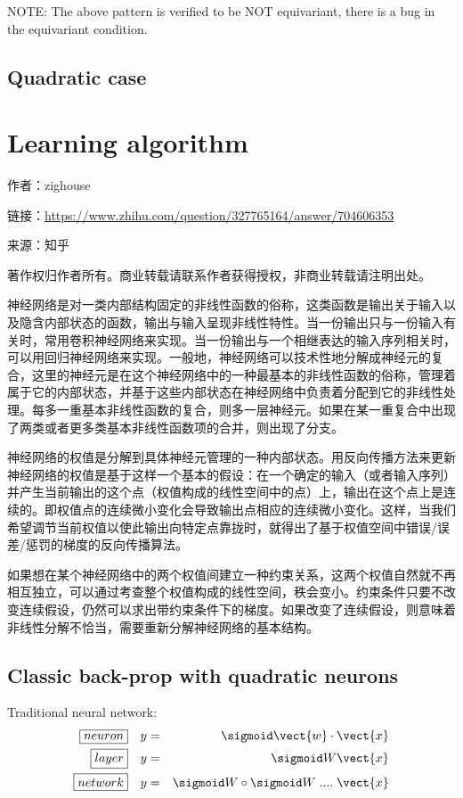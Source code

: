 NOTE:  The above pattern is verified to be NOT equivariant, there is a bug in the equivariant condition.

\subsection{Quadratic case}

\section{Learning algorithm}

作者：zighouse

链接：\url{https://www.zhihu.com/question/327765164/answer/704606353}

来源：知乎

著作权归作者所有。商业转载请联系作者获得授权，非商业转载请注明出处。

神经网络是对一类内部结构固定的非线性函数的俗称，这类函数是输出关于输入以及隐含内部状态的函数，输出与输入呈现非线性特性。当一份输出只与一份输入有关时，常用卷积神经网络来实现。当一份输出与一个相继表达的输入序列相关时，可以用回归神经网络来实现。一般地，神经网络可以技术性地分解成神经元的复合，这里的神经元是在这个神经网络中的一种最基本的非线性函数的俗称，管理着属于它的内部状态，并基于这些内部状态在神经网络中负责着分配到它的非线性处理。每多一重基本非线性函数的复合，则多一层神经元。如果在某一重复合中出现了两类或者更多类基本非线性函数项的合并，则出现了分支。

神经网络的权值是分解到具体神经元管理的一种内部状态。用反向传播方法来更新神经网络的权值是基于这样一个基本的假设：在一个确定的输入（或者输入序列）并产生当前输出的这个点（权值构成的线性空间中的点）上，输出在这个点上是连续的。即权值点的连续微小变化会导致输出点相应的连续微小变化。这样，当我们希望调节当前权值以使此输出向特定点靠拢时，就得出了基于权值空间中错误/误差/惩罚的梯度的反向传播算法。

如果想在某个神经网络中的两个权值间建立一种约束关系，这两个权值自然就不再相互独立，可以通过考查整个权值构成的线性空间，秩会变小。约束条件只要不改变连续假设，仍然可以求出带约束条件下的梯度。如果改变了连续假设，则意味着非线性分解不恰当，需要重新分解神经网络的基本结构。

\subsection{Classic back-prop with quadratic neurons}

Traditional neural network:
\begin{eqnarray}
\boxed{neuron} \quad & y = & \sigmoid \vect{w} \cdot \vect{x} \nonumber \\
\boxed{layer} \quad & y = & \sigmoid W \vect{x} \nonumber \\
\boxed{network} \quad & y = & \sigmoid W \circ \sigmoid W \; .... \; \vect{x} 
\end{eqnarray}

